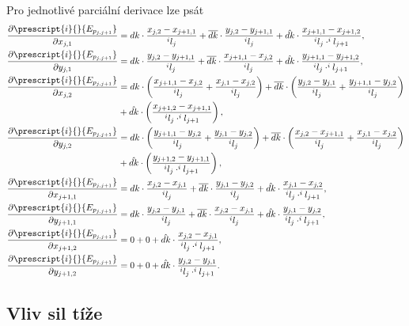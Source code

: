 Pro jednotlivé parciální derivace lze psát
\begin{align}
	\frac{\partial \prescript{i}{}{E_{p _{j,j+1}}}}{\partial x_{j,1}} &= dk \cdot \frac{x_{j,2}-x_{j+1,1}}{^il_j} + \overline{dk} \cdot \frac{y_{j,2} - y_{j+1,1} }{^il_j} + \hat{dk} \cdot \frac{x_{j+1,1} - x_{j+1,2}}{^il_j \cdot ^il_{j+1}} ,\\
	\frac{\partial \prescript{i}{}{E_{p _{j,j+1}}}}{\partial y_{j,1}} &= dk \cdot \frac{y_{j,2}-y_{j+1,1}}{^il_j} + \overline{dk} \cdot \frac{x_{j+1,1} - x_{j,2} }{^il_j} + \hat{dk} \cdot \frac{y_{j+1,1} - y_{j+1,2}}{^il_j \cdot ^il_{j+1}} ,\\
	\frac{\partial \prescript{i}{}{E_{p _{j,j+1}}}}{\partial x_{j,2}} &= dk \cdot \left( \frac{x_{j+1,1}-x_{j,2}}{^il_j} + \frac{x_{j,1}-x_{j,2}}{^il_j}\right) + \overline{dk} \cdot \left( \frac{y_{j,2} - y_{j,1} }{^il_j} + \frac{y_{j+1,1} - y_{j,2} }{^il_j} \right) \notag \\ &+ \hat{dk} \cdot \left( \frac{x_{j+1,2} - x_{j+1,1}}{^il_j \cdot ^il_{j+1}} \right) ,\\
	\frac{\partial \prescript{i}{}{E_{p _{j,j+1}}}}{\partial y_{j,2}} &= dk \cdot \left( \frac{y_{j+1,1}-y_{j,2}}{^il_j} + \frac{y_{j,1}-y_{j,2}}{^il_j}\right) + \overline{dk} \cdot \left( \frac{x_{j,2} - x_{j+1,1} }{^il_j} + \frac{x_{j,1} - x_{j,2} }{^il_j} \right) \notag \\ &+ \hat{dk} \cdot \left( \frac{y_{j+1,2} - y_{j+1,1}}{^il_j \cdot ^il_{j+1}} \right) ,\\
	\frac{\partial \prescript{i}{}{E_{p _{j,j+1}}}}{\partial x_{j+1,1}} &= dk \cdot \frac{x_{j,2}-x_{j,1}}{^il_j} + \overline{dk} \cdot \frac{y_{j,1} - y_{j,2} }{^il_j} + \hat{dk} \cdot \frac{x_{j,1} - x_{j,2}}{^il_j \cdot ^il_{j+1}} ,\\
	\frac{\partial \prescript{i}{}{E_{p _{j,j+1}}}}{\partial y_{j+1,1}} &= dk \cdot \frac{y_{j,2}-y_{j,1}}{^il_j} + \overline{dk} \cdot \frac{x_{j,2} - x_{j,1} }{^il_j} + \hat{dk} \cdot \frac{y_{j,1} - y_{j,2}}{^il_j \cdot ^il_{j+1}} ,\\
	\frac{\partial \prescript{i}{}{E_{p _{j,j+1}}}}{\partial x_{j+1,2}} &= 0+ 0+ \hat{dk} \cdot \frac{x_{j,2} - x_{j,1}}{^il_j \cdot ^il_{j+1}} ,\\
	\frac{\partial \prescript{i}{}{E_{p _{j,j+1}}}}{\partial y_{j+1,2}} &= 0+ 0+ \hat{dk} \cdot \frac{y_{j,2} - y_{j,1}}{^il_j \cdot ^il_{j+1}}.
\end{align}

\subsection{Vliv sil tíže}

